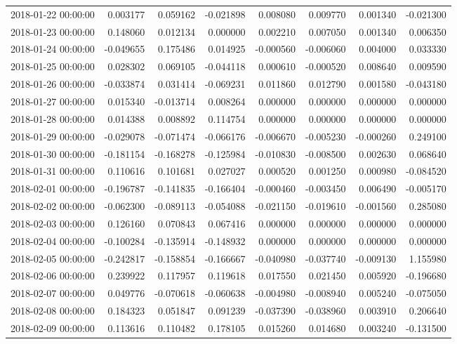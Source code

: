 \begin{tabular}{lrrrrrrr}
2018-01-22 00:00:00 & 0.003177 & 0.059162 & -0.021898 & 0.008080 & 0.009770 & 0.001340 & -0.021300 \\
2018-01-23 00:00:00 & 0.148060 & 0.012134 & 0.000000 & 0.002210 & 0.007050 & 0.001340 & 0.006350 \\
2018-01-24 00:00:00 & -0.049655 & 0.175486 & 0.014925 & -0.000560 & -0.006060 & 0.004000 & 0.033330 \\
2018-01-25 00:00:00 & 0.028302 & 0.069105 & -0.044118 & 0.000610 & -0.000520 & 0.008640 & 0.009590 \\
2018-01-26 00:00:00 & -0.033874 & 0.031414 & -0.069231 & 0.011860 & 0.012790 & 0.001580 & -0.043180 \\
2018-01-27 00:00:00 & 0.015340 & -0.013714 & 0.008264 & 0.000000 & 0.000000 & 0.000000 & 0.000000 \\
2018-01-28 00:00:00 & 0.014388 & 0.008892 & 0.114754 & 0.000000 & 0.000000 & 0.000000 & 0.000000 \\
2018-01-29 00:00:00 & -0.029078 & -0.071474 & -0.066176 & -0.006670 & -0.005230 & -0.000260 & 0.249100 \\
2018-01-30 00:00:00 & -0.181154 & -0.168278 & -0.125984 & -0.010830 & -0.008500 & 0.002630 & 0.068640 \\
2018-01-31 00:00:00 & 0.110616 & 0.101681 & 0.027027 & 0.000520 & 0.001250 & 0.000980 & -0.084520 \\
2018-02-01 00:00:00 & -0.196787 & -0.141835 & -0.166404 & -0.000460 & -0.003450 & 0.006490 & -0.005170 \\
2018-02-02 00:00:00 & -0.062300 & -0.089113 & -0.054088 & -0.021150 & -0.019610 & -0.001560 & 0.285080 \\
2018-02-03 00:00:00 & 0.126160 & 0.070843 & 0.067416 & 0.000000 & 0.000000 & 0.000000 & 0.000000 \\
2018-02-04 00:00:00 & -0.100284 & -0.135914 & -0.148932 & 0.000000 & 0.000000 & 0.000000 & 0.000000 \\
2018-02-05 00:00:00 & -0.242817 & -0.158854 & -0.166667 & -0.040980 & -0.037740 & -0.009130 & 1.155980 \\
2018-02-06 00:00:00 & 0.239922 & 0.117957 & 0.119618 & 0.017550 & 0.021450 & 0.005920 & -0.196680 \\
2018-02-07 00:00:00 & 0.049776 & -0.070618 & -0.060638 & -0.004980 & -0.008940 & 0.005240 & -0.075050 \\
2018-02-08 00:00:00 & 0.184323 & 0.051847 & 0.091239 & -0.037390 & -0.038960 & 0.003910 & 0.206640 \\
2018-02-09 00:00:00 & 0.113616 & 0.110482 & 0.178105 & 0.015260 & 0.014680 & 0.003240 & -0.131500 \\

\end{tabular}
